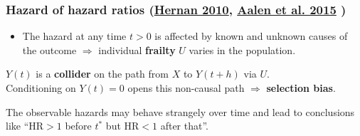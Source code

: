 \documentclass[12pt,dvipsnames,t,aspectratio=169, handout%
]{beamer}
\begin{document}
\begin{frame}
\frametitle{\large Hazard of hazard ratios {\small (\href{https://doi.org/10.1097/EDE.0b013e3181c1ea43}{Hernan 2010}, 
  \href{https://doi.org/10.1007/s10985-015-9335-y}{Aalen et al. 2015} ) } }

\begin{itemize}
\item
The hazard at any time $t > 0$ is affected by known and unknown causes of the outcome
$\Rightarrow$ individual {\bf frailty} $U$ varies in the population.
\end{itemize}
{\small
}
\bi
\item
$Y(t)$ %
is a {\bf collider} on the path from $X$ to $Y(t+h)$ via $U$. \\ 
Conditioning on $Y(t)=0$ opens this non-causal path $\Rightarrow$ \textbf{selection bias}.
\medskip
\item
The observable hazards may behave strangely over time and lead to
conclusions like ``HR$>1$ before $t^*$ but HR$<1$ after that''.
\ei
\end{frame}
\end{document}
